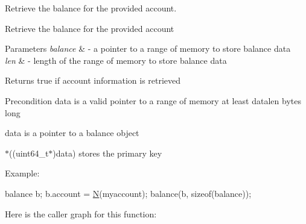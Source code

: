 Retrieve the balance for the provided account. 

Retrieve the balance for the provided account


\begin{DoxyParams}{Parameters}
{\em balance} & -\/ a pointer to a range of memory to store balance data \\
\hline
{\em len} & -\/ length of the range of memory to store balance data \\
\hline
\end{DoxyParams}
\begin{DoxyReturn}{Returns}
true if account information is retrieved
\end{DoxyReturn}
\begin{DoxyPrecond}{Precondition}
data is a valid pointer to a range of memory at least datalen bytes long 

data is a pointer to a balance object 

$\ast$((uint64\+\_\+t$\ast$)data) stores the primary key
\end{DoxyPrecond}
Example\+: 
\begin{DoxyCode}
balance b;
b.account = \mbox{\hyperlink{group__types_gaf9c1edb0e0da55ec6ba09f32f6839529}{N}}(myaccount);
balance(b, \textcolor{keyword}{sizeof}(balance));
\end{DoxyCode}
 Here is the caller graph for this function\+:
